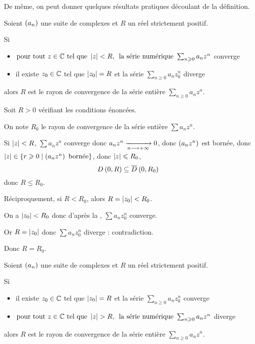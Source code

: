 De même, on peut donner quelques résultats pratiques découlant de la définition.

\begin{prop}
Soient \(\left(a_n\right)\) une suite de complexes et \(R\) un réel strictement positif.

Si

\begin{itemize}
    \item \(\quantifs{\tpt z\in\C\text{ tel que }\abs{z}<R}\text{la série numérique }\sum_{n\geq0}a_nz^n\) converge \\
    \item il existe \(z_0\in\mathbb{C}\) tel que \(\left\lvert z_0\right\rvert=R\) et la série \(\sum_{n\geq0}a_nz_0^n\) diverge
\end{itemize}

alors \(R\) est le rayon de convergence de la série entière \(\sum_{n\geq0}a_nz^n\).
\end{prop}

\begin{dem}
Soit \(R>0\) vérifiant les conditions énoncées.

On note \(R_0\) le rayon de convergence de la série entière \(\sum a_nz^n\).

Si \(\left\lvert z\right\rvert<R\), \(\sum a_nz^n\) converge donc \(a_nz^n\xrightarrow[n\longrightarrow+\infty]{}0\), donc \(\left(a_nz^n\right)\) est bornée, donc \(\left\lvert z\right\rvert\in\left\lbrace r\geqslant0\;\middle|\;\left(a_nz^n\right)\text{ bornée}\right\rbrace\), donc \(\left\lvert z\right\rvert\leqslant R_0\), \ie \[\disqueo{0}{R}\subset\disquef{0}{R_0}\] donc \(R\leq R_0\).

Réciproquement, si \(R<R_0\), alors \(R=\left\lvert z_0\right\rvert<R_0\).

On a \(\left\lvert z_0\right\rvert<R_0\) donc d'après la , \(\sum a_nz_0^n\) converge.

Or \(R=\left\lvert z_0\right\rvert\) donc \(\sum a_nz_0^n\) diverge : contradiction.

Donc \(R=R_0\).
\end{dem}

\begin{prop}
Soient \(\left(a_n\right)\) une suite de complexes et \(R\) un réel strictement positif.

Si

\begin{itemize}
    \item il existe \(z_0\in\mathbb{C}\) tel que \(\left\lvert z_0\right\rvert=R\) et la série \(\sum_{n\geq0}a_nz_0^n\) converge \\
    \item \(\quantifs{\tpt z\in\C\text{ tel que }\abs{z}>R}\text{la série numérique }\sum_{n\geq0}a_nz^n\) diverge \\
\end{itemize}

alors \(R\) est le rayon de convergence de la série entière \(\sum_{n\geq0}a_nz^n\).
\end{prop}

